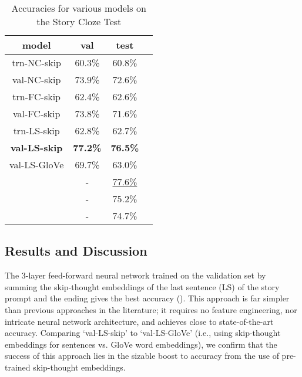 \documentclass[11pt,a4paper]{article}
\begin{document}
\begin{table}[t!]
\begin{center}
\begin{tabular}{|c|c|c|c|}
\hline \bf model & \bf val & \bf test \\ \hline
trn-NC-skip & 60.3\% & 60.8\% \\
val-NC-skip & 73.9\% & 72.6\% \\ \hline
trn-FC-skip & 62.4\% & 62.6\% \\
val-FC-skip & 73.8\% & 71.6\% \\ \hline
trn-LS-skip & 62.8\% & 62.7\% \\
{\bf val-LS-skip} & {\bf 77.2\%} & {\bf 76.5\%} \\
val-LS-GloVe & 69.7\% & 63.0\% \\ \hline
\citet{Chaturvedi2017StoryCF} & - & \underline{77.6\%} \\
\citet{schwartz2017story} & - & 75.2\% \\
\citet{Cai2017PayAT} & - & 74.7\%\\
\hline
\end{tabular}
\end{center}
\caption{\label{results} Accuracies for various models on the Story Cloze Test}
\end{table}

















\subsection{Results and Discussion}

The 3-layer feed-forward neural network trained on the validation set by summing the skip-thought embeddings of the last sentence (LS) of the story prompt and the ending gives the best accuracy (). This approach is far simpler than previous approaches in the literature; it requires no feature engineering, nor intricate neural network architecture, and achieves close to state-of-the-art accuracy. Comparing `val-LS-skip' to `val-LS-GloVe' (i.e., using skip-thought embeddings for sentences vs. GloVe word embeddings), we confirm that the success of this approach lies in the sizable boost to accuracy from the use of pre-trained skip-thought embeddings.
\end{document}
